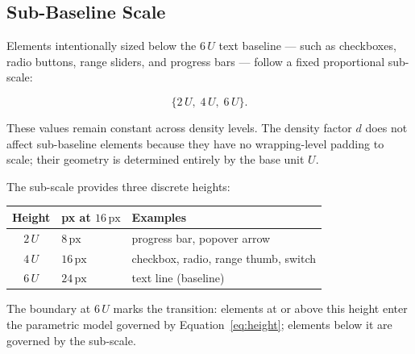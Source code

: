 \subsection{Sub-Baseline Scale}
\label{sec:sub-baseline}

Elements intentionally sized below the $6\,U$ text baseline --- such as checkboxes, radio buttons, range sliders, and progress bars --- follow a fixed proportional sub-scale:

\begin{equation}
\{2\,U,\; 4\,U,\; 6\,U\}.
\end{equation}

These values remain constant across density levels. The density factor $d$ does not affect sub-baseline elements because they have no wrapping-level padding to scale; their geometry is determined entirely by the base unit $U$.

The sub-scale provides three discrete heights:

\begin{center}
\begin{tabular}{cll}
\toprule
Height & px at $16\,\text{px}$ & Examples \\
\midrule
$2\,U$ & $8\,\text{px}$ & progress bar, popover arrow \\
$4\,U$ & $16\,\text{px}$ & checkbox, radio, range thumb, switch \\
$6\,U$ & $24\,\text{px}$ & text line (baseline) \\
\bottomrule
\end{tabular}
\end{center}

The boundary at $6\,U$ marks the transition: elements at or above this height enter the parametric model governed by Equation~\ref{eq:height}; elements below it are governed by the sub-scale.
